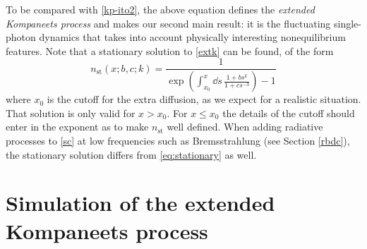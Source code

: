 \documentclass[a4paper,12pt,reqno,superscriptaddress,nofootinbib]{revtex4}
\newcommand{\0}{^{(0)}}
\newcommand{\1}{^{(1)}}
\newcommand{\2}{^{(2)}}
\begin{document}
To be compared with \eqref{kp-ito2}, the above equation defines the \textit{extended Kompaneets process} and makes our second main result: it is the fluctuating single-photon dynamics that takes into account physically interesting nonequilibrium features.  Note that a stationary solution to \eqref{extk} can be found, of the form
\begin{equation}\label{eq:stationary}
n_\text{st}(x;b,c;k) = \frac{1}{\exp\left(\int_{x_0}^x \dd s \, \frac{1+bs^k}{1+cs^{-3}}\right) - 1} 
\end{equation}
where $x_0$ is the cutoff for the extra diffusion, as we expect for a realistic situation. That solution is only valid for $x>x_0$. For $x\leq x_0$ the details of the cutoff should enter in the exponent as to make $n_\text{st}$ well defined. When adding radiative processes to \eqref{sc} at low frequencies such as Bremsstrahlung (see Section \ref{rbdc}), the stationary solution differs from \eqref{eq:stationary} as well.


%
%
%
%




\section{Simulation of the extended Kompaneets process}\label{simex}
\end{document}
